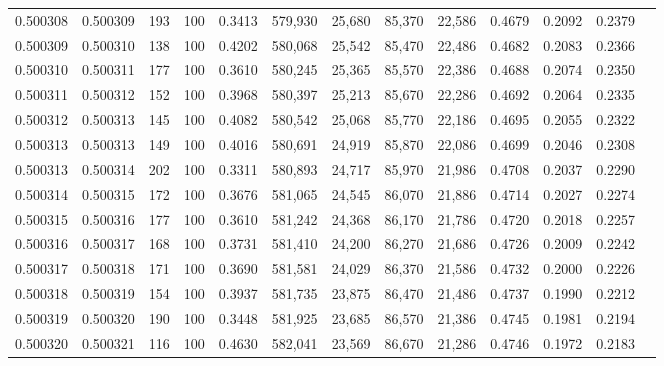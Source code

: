 \begin{tabular}{rrrrrrrrrrrrr}
0.500308 & 0.500309 &   193 & 100 &                                     0.3413 & 579,930 &  25,680 &  85,370 &  22,586 & 0.4679 & 0.2092 & 0.2379 \\
0.500309 & 0.500310 &   138 & 100 &                                     0.4202 & 580,068 &  25,542 &  85,470 &  22,486 & 0.4682 & 0.2083 & 0.2366 \\
0.500310 & 0.500311 &   177 & 100 &                                     0.3610 & 580,245 &  25,365 &  85,570 &  22,386 & 0.4688 & 0.2074 & 0.2350 \\
0.500311 & 0.500312 &   152 & 100 &                                     0.3968 & 580,397 &  25,213 &  85,670 &  22,286 & 0.4692 & 0.2064 & 0.2335 \\
0.500312 & 0.500313 &   145 & 100 &                                     0.4082 & 580,542 &  25,068 &  85,770 &  22,186 & 0.4695 & 0.2055 & 0.2322 \\
0.500313 & 0.500313 &   149 & 100 &                                     0.4016 & 580,691 &  24,919 &  85,870 &  22,086 & 0.4699 & 0.2046 & 0.2308 \\
0.500313 & 0.500314 &   202 & 100 &                                     0.3311 & 580,893 &  24,717 &  85,970 &  21,986 & 0.4708 & 0.2037 & 0.2290 \\
0.500314 & 0.500315 &   172 & 100 &                                     0.3676 & 581,065 &  24,545 &  86,070 &  21,886 & 0.4714 & 0.2027 & 0.2274 \\
0.500315 & 0.500316 &   177 & 100 &                                     0.3610 & 581,242 &  24,368 &  86,170 &  21,786 & 0.4720 & 0.2018 & 0.2257 \\
0.500316 & 0.500317 &   168 & 100 &                                     0.3731 & 581,410 &  24,200 &  86,270 &  21,686 & 0.4726 & 0.2009 & 0.2242 \\
0.500317 & 0.500318 &   171 & 100 &                                     0.3690 & 581,581 &  24,029 &  86,370 &  21,586 & 0.4732 & 0.2000 & 0.2226 \\
0.500318 & 0.500319 &   154 & 100 &                                     0.3937 & 581,735 &  23,875 &  86,470 &  21,486 & 0.4737 & 0.1990 & 0.2212 \\
0.500319 & 0.500320 &   190 & 100 &                                     0.3448 & 581,925 &  23,685 &  86,570 &  21,386 & 0.4745 & 0.1981 & 0.2194 \\
0.500320 & 0.500321 &   116 & 100 &                                     0.4630 & 582,041 &  23,569 &  86,670 &  21,286 & 0.4746 & 0.1972 & 0.2183 \\

\end{tabular}
